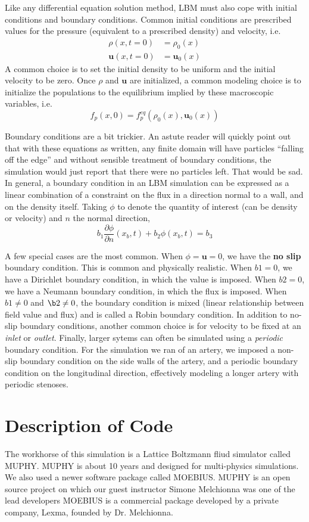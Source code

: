 \documentclass[11pt]{article} %
\renewcommand{\vec}[1]{\mathbf{#1}}
\begin{document}
Like any differential equation solution method, LBM must also cope with initial conditions and boundary conditions.
Common initial conditions are prescribed values for the pressure (equivalent to a prescribed density)
and velocity, i.e.
\begin{align*}
\rho(x, t=0) &= \rho_0(x) \\
\vec{u}(x, t=0) &= \vec{u}_0(x)
\end{align*}
A common choice is to set the initial density to be uniform and the initial velocity to be zero.
Once $\rho$ and $\vec{u}$ are initialized, a common modeling choice is to initialize the
populations to the equilibrium implied by these macroscopic variables, i.e.
$$f_p(x, 0) = f_p^{eq}(\rho_0(x), \vec{u}_0(x))$$

Boundary conditions are a bit trickier.  
An astute reader will quickly point out that with these equations as written,
any finite domain will have particles ``falling off the edge'' and without
sensible treatment of boundary conditions, the simulation would just report
that there were no particles left.  That would be sad.
In general, a boundary condition in an LBM simulation can be expressed as 
a linear combination of a constraint on the flux in a direction normal to a wall,
and on the density itself.  
Taking $\phi$ to denote the quantity of interest (can be density or velocity) 
and $n$ the normal direction,
$$b_1 \frac{\partial \phi}{\partial n}(x_b, t) + b_2 \phi(x_b, t) = b_3$$ 

A few special cases are the most common.  
When $\phi = \vec{u} = 0$, we have the \textbf{no slip} boundary condition.
This is common and physically realistic.
When $b1 = 0$, we have a Dirichlet boundary condition, in which the value is imposed.
When $b2 = 0$, we have a Neumann boundary condition, in which the flux is imposed.
When $b1 \ne 0$ and $\b2 \ne 0$, the boundary condition is mixed 
(linear relationship between field value and flux) and is called a Robin boundary condition.
In addition to no-slip boundary conditions, another common choice is for velocity
to be fixed at an \textit{inlet} or \textit{outlet}.
Finally, larger sytems can often be simulated using a \textit{periodic} boundary condition.
For the simulation we ran of an artery, we imposed a non-slip boundary condition on the
side walls of the artery, and a periodic boundary condition on the longitudinal direction,
effectively modeling a longer artery with periodic stenoses.

\newpage
\section{Description of Code}
The workhorse of this simulation is a Lattice Boltzmann fliud simulator called MUPHY.
MUPHY is about 10 years and designed for multi-physics simulations.
We also used a newer software package called MOEBIUS.
MUPHY is an open source project on which our guest instructor Simone Melchionna
was one of the lead developers
MOEBIUS is a commercial package developed by a private company,
Lexma, founded by Dr. Melchionna.
\end{document}
